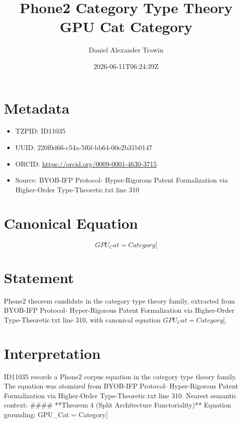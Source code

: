 \documentclass[11pt]{article}
\title{Phone2 Category Type Theory GPU Cat Category}
\author{Daniel Alexander Trawin}
\date{2026-06-11T06:24:39Z}
\begin{document}
\maketitle
\section*{Metadata}
\begin{itemize}
\item TZPID: ID11035
\item UUID: 220f0d66-c54a-5f6f-bb64-00e2b31b0147
\item ORCID: \url{https://orcid.org/0009-0001-4630-3715}
\item Source: BYOB-IFP Protocol- Hyper-Rigorous Patent Formalization via Higher-Order Type-Theoretic.txt line 310
\end{itemize}
\section*{Canonical Equation}
\[
GPU_Cat = Category[
\]
\section*{Statement}
Phone2 theorem candidate in the category type theory family, extracted from BYOB-IFP Protocol- Hyper-Rigorous Patent Formalization via Higher-Order Type-Theoretic.txt line 310, with canonical equation $GPU_Cat = Category[$.
\section*{Interpretation}
ID11035 records a Phone2 corpus equation in the category type theory family. The equation was atomized from BYOB-IFP Protocol- Hyper-Rigorous Patent Formalization via Higher-Order Type-Theoretic.txt line 310. Nearest semantic context: #### **Theorem 4 (Split Architecture Functoriality)** Equation grounding: GPU_Cat = Category[
\end{document}
